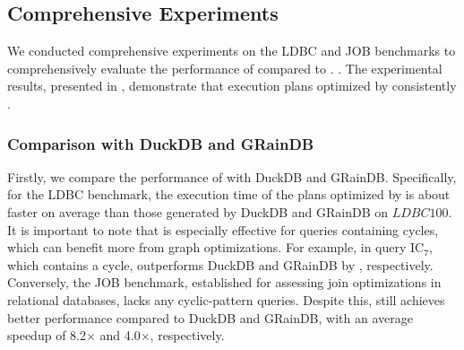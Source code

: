 \subsection{Comprehensive Experiments}
\label{sec:experiment-e2e}

We conducted comprehensive experiments on the LDBC and JOB benchmarks to comprehensively evaluate the performance of \name compared to . 
.
The experimental results, presented in , demonstrate that execution plans optimized by \name consistently .

\subsubsection{Comparison with DuckDB and GRainDB}

Firstly, we compare the performance of \name with DuckDB and GRainDB.
Specifically, for the LDBC benchmark, the execution time of the plans optimized by \name is about  faster on average than those generated by DuckDB and GRainDB on $LDBC100$.
It is important to note that \name is especially effective for queries containing cycles, which can benefit more from graph optimizations. For example, in query $\text{IC}_{7}$, which contains a cycle, \name outperforms DuckDB and GRainDB by , respectively.
Conversely, the JOB benchmark, established for assessing join optimizations in relational databases, lacks any cyclic-pattern queries. Despite this, \name still achieves better performance compared to DuckDB and GRainDB, with an average speedup of 8.2$\times$ and 4.0$\times$, respectively.

